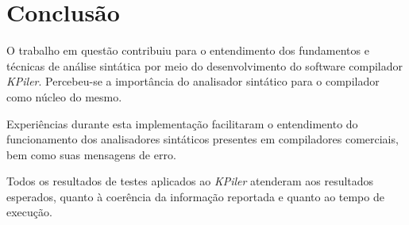 \chapter[Conclusão]{Conclusão}
\label{cap:conclusao}

O trabalho em questão contribuiu para o entendimento dos fundamentos e técnicas de análise sintática por meio do desenvolvimento do software compilador \textit{KPiler}. Percebeu-se a importância do analisador sintático para o compilador como núcleo do mesmo.

Experiências durante esta implementação facilitaram o entendimento do funcionamento dos analisadores sintáticos presentes em compiladores comerciais, bem como suas mensagens de erro.

Todos os resultados de testes aplicados ao \textit{KPiler} atenderam aos resultados esperados, quanto à coerência da informação reportada e quanto ao tempo de execução.
